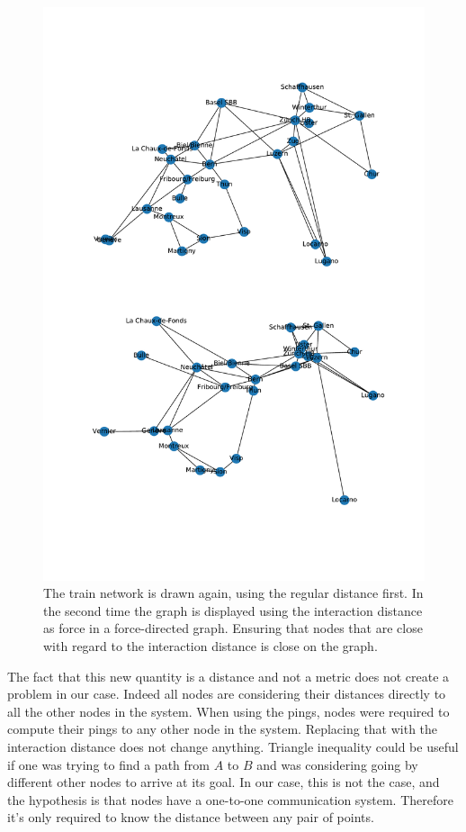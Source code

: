 \documentclass[a4paper,11pt,oneside]{report}
\begin{document}
\begin{figure}[!h] 
\centering
\includegraphics[width=350pt]{figures/CFF-NewDistances}
\caption{The train network is drawn again, using the regular distance first. In
 the second time the graph is displayed using the interaction distance as
 force in a force-directed graph. Ensuring that nodes that are close with
 regard to the interaction distance is close on the graph.}
 \label{fig:CFF-NewDistances}
\end{figure}

The fact that this new quantity is a distance and not a metric does not create
a problem in our case. Indeed all nodes are considering their distances directly
to all the other nodes in the system. When using the pings, nodes were required
to compute their pings to any other node in the system. Replacing that with the
interaction distance does not change anything. Triangle inequality could be
useful if one was trying to find a path from $A$ to $B$ and was considering
going by different other nodes to arrive at its goal. In our case, this is not
the case, and the hypothesis is that nodes have a one-to-one communication system.
Therefore it's only required to know the distance between any pair of points.
\end{document}
